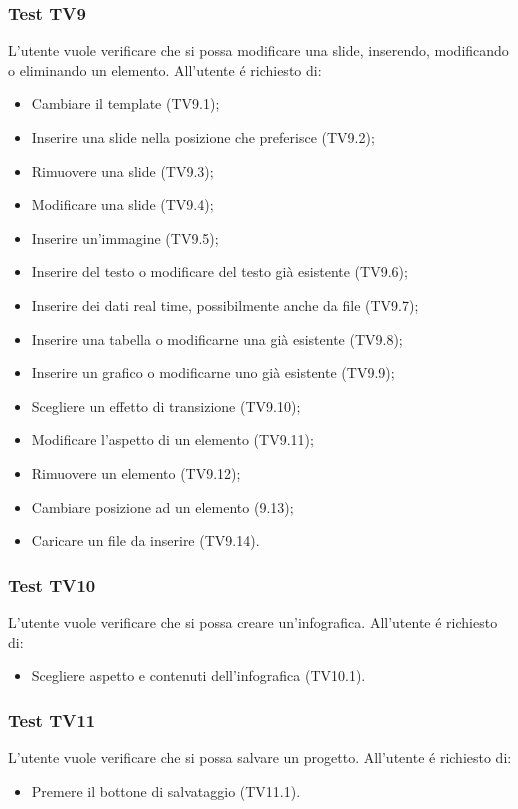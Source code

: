 \subsubsection{Test TV9}
L'utente vuole verificare che si possa modificare una slide, inserendo, modificando o eliminando un elemento. \newline
All'utente é richiesto di:
\begin{itemize}
	\item Cambiare il template (TV9.1);
	\item Inserire una slide nella posizione che preferisce (TV9.2);
	\item Rimuovere una slide (TV9.3);
	\item Modificare una slide (TV9.4);
	\item Inserire un'immagine (TV9.5);
	\item Inserire del testo o modificare del testo già esistente (TV9.6);
	\item Inserire dei dati real time, possibilmente anche da file (TV9.7);
	\item Inserire una tabella o modificarne una già esistente (TV9.8);
	\item Inserire un grafico o modificarne uno già esistente (TV9.9);
	\item Scegliere un effetto di transizione (TV9.10);
	\item Modificare l'aspetto di un elemento (TV9.11);
	\item Rimuovere un elemento (TV9.12);
	\item Cambiare posizione ad un elemento (9.13);
	\item Caricare un file da inserire (TV9.14).
\end{itemize}

\subsubsection{Test TV10}
L'utente vuole verificare che si possa creare un'infografica. \newline
All'utente é richiesto di:
\begin{itemize}
	\item Scegliere aspetto e contenuti dell'infografica (TV10.1).
\end{itemize}

\subsubsection{Test TV11}
L'utente vuole verificare che si possa salvare un progetto. \newline
All'utente é richiesto di:
\begin{itemize}
	\item Premere il bottone di salvataggio (TV11.1).
\end{itemize}

